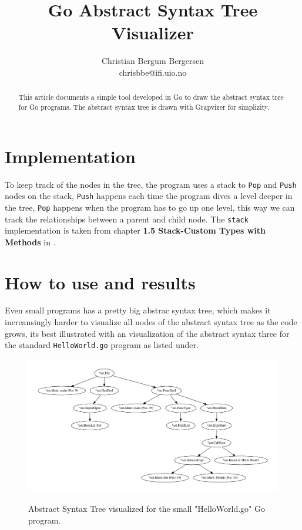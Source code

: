 \documentclass[a4paper,USenglish]{article}
\title{Go Abstract Syntax Tree Visualizer}
\author{Christian Bergum Bergersen\\ chrisbbe@ifi.uio.no}
\begin{document}
\maketitle


\begin{abstract}
This article documents a simple tool developed in Go to draw the abstract syntax tree for
Go programs. The abstract syntax tree is drawn with Grapvizer for simplizity.
\end{abstract}

\section{Implementation}
To keep track of the nodes in the tree, the program uses a stack to \texttt{Pop} and \texttt{Push}
nodes on the stack, \texttt{Push} happens each time the program dives a level deeper in the
tree, \texttt{Pop} happens when the program has to go up one level, this way we can track the
relationships between a parent and child node. The \texttt{stack} implementation is taken from
chapter \textbf{1.5 Stack-Custom Types with Methods} in \cite{summerfield:go}.

\section{How to use and results}
Even small programs has a pretty big abstrac syntax tree, which makes it increansingly harder
to visualize all nodes of the abstract syntax tree as the code grows, its best illustrated with
an visualization of the abstract syntax three for the standard \texttt{HelloWorld.go} program as
listed under.



\begin{figure}[htp]
  \centering
  \includegraphics[scale=0.5]{HelloWorld.pdf}
  \label{}
  \caption{Abstract Syntax Tree visualized for the small "HelloWorld.go" Go program.}
\end{figure}
\end{document}
